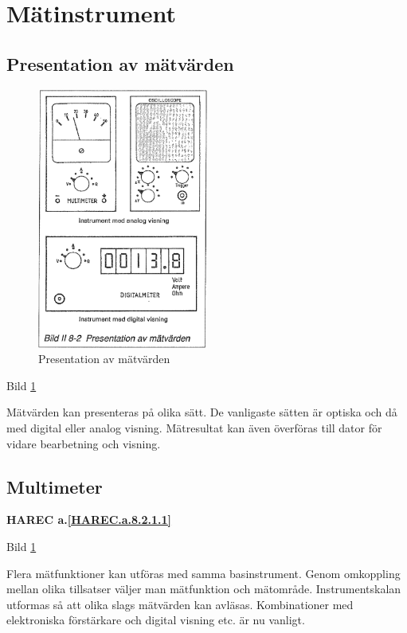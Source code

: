 \section{Mätinstrument}

\subsection{Presentation av mätvärden}

\begin{figure}
  \includegraphics[width=0.5\textwidth]{images/bild_2_8-02}
  \caption{Presentation av mätvärden}
  \label{fig:bildII8-2}
\end{figure}

Bild \ref{fig:bildII8-2}

Mätvärden kan presenteras på olika sätt. De vanligaste sätten är
optiska och då med digital eller analog visning. Mätresultat kan även
överföras till dator för vidare bearbetning och visning.

\subsection{Multimeter}
\textbf{
HAREC a.\ref{HAREC.a.8.2.1.1}\label{myHAREC.a.8.2.1.1}
}

Bild \ref{fig:bildII8-2}

Flera mätfunktioner kan utföras med samma basinstrument. Genom
omkoppling mellan olika tillsatser väljer man mätfunktion och
mätområde. Instrumentskalan utformas så att olika slags mätvärden kan
avläsas.  Kombinationer med elektroniska förstärkare och digital
visning etc. är nu vanligt.


